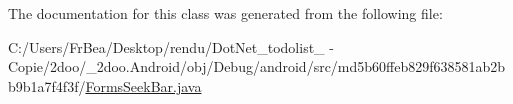 The documentation for this class was generated from the following file:\begin{CompactItemize}
\item 
C:/Users/FrBea/Desktop/rendu/DotNet\_\-todolist\_ - Copie/2doo/\_\-2doo.Android/obj/Debug/android/src/md5b60ffeb829f638581ab2bb9b1a7f4f3f/\hyperlink{_forms_seek_bar_8java}{FormsSeekBar.java}\end{CompactItemize}
